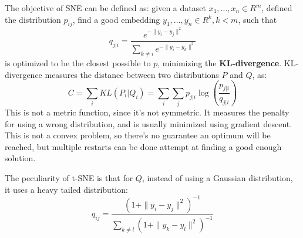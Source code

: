 The objective of SNE can be defined as: given a dataset $x_1, \dots, x_n \in R^m$, defined the distribution $p_{ij}$, find a good embedding $y_1, \dots, y_n \in R^k, k < m$, such that
\begin{equation*}
    q_{j|i} = \dfrac{e^{-\|y_i - y_j\|^2}}{\sum_{k \neq i} e^{-\|y_i - y_k\|^2}}
\end{equation*}
is optimized to be the closest possible to $p$, minimizing the \textbf{KL-divergence}. KL-divergence measures the distance between two distributions $P$ and $Q$, as:
\begin{equation*}
    C = \sum_i KL(P_i | Q_i) = \sum_i \sum_j p_{j|i} \log(\frac{p_{j|i}}{q_{j|i}})
\end{equation*}
This is not a metric function, since it's not symmetric. It measures the penalty for using a wrong distribution, and is usually minimized using gradient descent. This is not a convex problem, so there's no guarantee an optimum will be reached, but multiple restarts can be done attempt at finding a good enough solution.

The peculiarity of t-SNE is that for $Q$, instead of using a Gaussian distribution, it uses a heavy tailed distribution:
\begin{equation*}
    q_{ij} = \dfrac{(1 + \|y_i - y_j\|^2)^{-1}}{\sum_{k \neq l} (1 + \|y_k - y_l\|^2)^{-1}}
\end{equation*}
